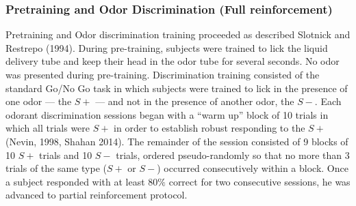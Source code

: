 \subsubsection*{Pretraining and Odor Discrimination (Full reinforcement)}
\label{sec:methods_pretraining}
Pretraining and Odor discrimination training proceeded as described Slotnick and Restrepo (1994). During pre-training, subjects were trained to lick the liquid delivery tube and keep their head in the odor tube for several seconds. No odor was presented during pre-training.
Discrimination training consisted of the standard Go/No Go task in which subjects were trained to lick in the presence of one odor --- the $S+$ --- and not in the presence of another odor, the $S-$.  Each odorant discrimination sessions began with a ``warm up'' block of 10 trials in which all trials were $S+$ in order to establish robust responding to the $S+$  (Nevin, 1998, Shahan 2014).  The remainder of the session consisted of 9 blocks of 10 $S+$ trials and 10 $S-$ trials, ordered pseudo-randomly so that no more than 3 trials of the same type ($S+$ or $S-$) occurred consecutively within a block. Once a subject responded with at least $80\%$ correct for two consecutive sessions, he was advanced to partial reinforcement protocol.
  